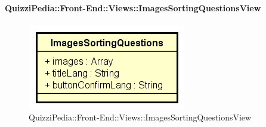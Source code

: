 \paragraph{QuizziPedia::Front-End::Views::ImagesSortingQuestionsView}
\begin{figure} [ht]
	\centering
	\includegraphics[scale=0.45]{UML/Classi/Front-End/QuizziPedia_Front-end_Views_ImagesSortingQuestionsView.png}
	\caption{QuizziPedia::Front-End::Views::ImagesSortingQuestionsView}
\end{figure} \FloatBarrier
